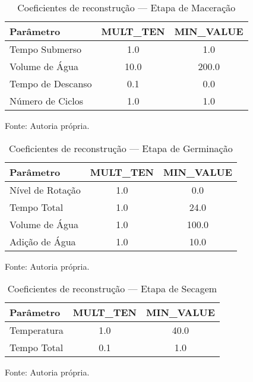 \begin{table}[ht]
    \caption{Coeficientes de reconstrução — Etapa de Maceração}
    \label{tab:coefmac}
    \centering
    \begin{tabular}{lcc}
        \hline
        \bfseries Parâmetro & \bfseries MULT\_TEN & \bfseries MIN\_VALUE \\
        \hline
        Tempo Submerso     & 1.0  & 1.0   \\
        Volume de Água     & 10.0 & 200.0 \\
        Tempo de Descanso  & 0.1  & 0.0   \\
        Número de Ciclos   & 1.0  & 1.0   \\
        \hline
    \end{tabular}
    
    {\centering\footnotesize Fonte: Autoria própria.\par}
\end{table}

\begin{table}[ht]
    \caption{Coeficientes de reconstrução — Etapa de Germinação}
    \label{tab:coefgerm}
    \centering
    \begin{tabular}{lcc}
        \hline
        \bfseries Parâmetro & \bfseries MULT\_TEN & \bfseries MIN\_VALUE \\
        \hline
        Nível de Rotação    & 1.0 & 0.0  \\
        Tempo Total         & 1.0 & 24.0 \\
        Volume de Água      & 1.0 & 100.0 \\
        Adição de Água      & 1.0 & 10.0 \\
        \hline
    \end{tabular}
    
    {\centering\footnotesize Fonte: Autoria própria.\par}
\end{table}

\begin{table}[ht]
    \caption{Coeficientes de reconstrução — Etapa de Secagem}
    \label{tab:coefsec}
    \centering
    \begin{tabular}{lcc}
        \hline
        \bfseries Parâmetro & \bfseries MULT\_TEN & \bfseries MIN\_VALUE \\
        \hline
        Temperatura  & 1.0 & 40.0 \\
        Tempo Total  & 0.1 & 1.0  \\
        \hline
    \end{tabular}
    
    {\centering\footnotesize Fonte: Autoria própria.\par}
\end{table}

